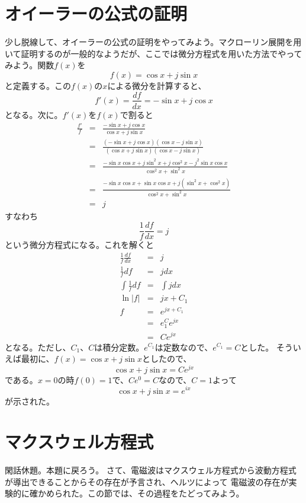 \section*{オイーラーの公式の証明}
少し脱線して、オイーラーの公式の証明をやってみよう。マクローリン展開を用いて証明するのが一般的なようだが、ここでは微分方程式を用いた方法でやってみよう。関数$f(x)$を
\[
f(x) = \cos x + j\sin x
\]
と定義する。この$f(x)$の$x$による微分を計算すると、
\[
f'(x) = \frac{df}{dx} = -\sin x + j\cos x
\]
となる。次に。$f'(x)$を$f(x)$で割ると
\begin{eqnarray*}
\frac{f'}{f} &=& \frac{-\sin x + j\cos x}{\cos x + j\sin x}\\
&=&\frac{(-\sin x + j\cos x)(\cos x - j\sin x)}{(\cos x + j\sin x)(\cos x - j\sin x)}\\
&=&\frac{-\sin x \cos x + j\sin^2 x + j\cos^2 x -j^2\sin x \cos x}{\cos^2 x + \sin^2 x}\\
&=&\frac{-\sin x \cos x + \sin x \cos x +j(\sin^2 x + \cos^2 x)}{\cos^2x + \sin^2x}\\
&=&j
\end{eqnarray*}
すなわち
\[
\frac{1}{f}\frac{df}{dx} = j
\]
という微分方程式になる。これを解くと
\begin{eqnarray*}
\frac{1}{f}\frac{df}{dx} &=& j\\
\frac{1}{f}df &=& jdx\\
\int \frac{1}{f} df &=& \int j dx\\
\ln|f| &=& jx + C_1\\
f &=& e^{jx+C_1}\\
  &=& e^C_1e^{jx}\\
 &=& C e^{jx}
\end{eqnarray*}
となる。ただし、$C_1$、$C$は積分定数。$e^{C_1}$は定数なので、$e^{C_1}=C$とした。
そういえば最初に、$f(x)=\cos x + j\sin x$としたので、
\[
\cos x + j\sin x = C e^{jx}
\]
である。$x=0$の時$f(0) = 1$で、$C e^{0} = C$なので、$C=1$よって
\[
\cos x + j\sin x = e^{ix}
\]
が示された。

\section*{マクスウェル方程式}
閑話休題。本題に戻ろう。
さて、電磁波はマクスウェル方程式から波動方程式が導出できることからその存在が予言され、ヘルツによって
電磁波の存在が実験的に確かめられた。この節では、その過程をたどってみよう。

